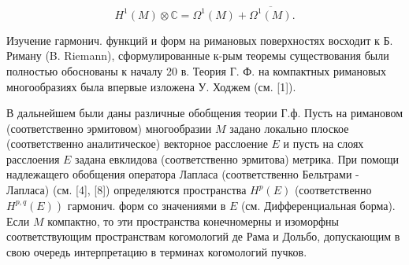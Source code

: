 \documentclass[10pt]{article}
\begin{document}
\[

H^{1}(M) \otimes \mathbb{C}=\Omega^{1}(M)+\overline{\Omega^{1}(M)} .

\]



Изучение гармонич. функций и форм на римановых поверхностях восходит к Б. Риману (B. Riemann), сформулированные к-рым теоремы существования были полностью обоснованы к началу 20 в. Теория Г. Ф. на компактных римановых многообразиях была впервые изложена У. Ходжем (см. [1]).



В дальнейшем были даны различные обобщения теории Г.ф. Пусть на римановом (соответственно эрмитовом) многообразии $M$ задано локально плоское (соответственно аналитическое) векторное расслоение $E$ и пусть на слоях расслоения $E$ задана евклидова (соответственно эрмитова) метрика. При помощи надлежащего обобщения оператора Лапласа (соответственно Бельтрами - Лапласа) (см. [4], [8]) определяются пространства $H^{p}(E)$ (соответственно $\left.H^{p, q}(E)\right)$ гармонич. форм со значениями в $E$ (см. Дифференциальная борма). Если $M$ компактно, то эти пространства конечномерны и изоморфны соответствующим пространствам когомологий де Рама и Дольбо, допускающим в свою очередь интерпретацию в терминах когомологий пучков.
\end{document}
